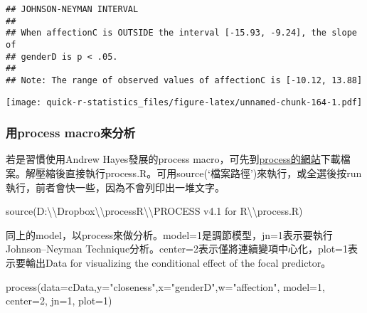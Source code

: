 \documentclass[
]{book}
\newenvironment{Shaded}{\begin{snugshade}}{\end{snugshade}}
\newcommand{\AttributeTok}[1]{\textcolor[rgb]{0.77,0.63,0.00}{#1}}
\newcommand{\DecValTok}[1]{\textcolor[rgb]{0.00,0.00,0.81}{#1}}
\newcommand{\FunctionTok}[1]{\textcolor[rgb]{0.00,0.00,0.00}{#1}}
\newcommand{\NormalTok}[1]{#1}
\newcommand{\SpecialCharTok}[1]{\textcolor[rgb]{0.00,0.00,0.00}{#1}}
\newcommand{\StringTok}[1]{\textcolor[rgb]{0.31,0.60,0.02}{#1}}
\begin{document}
\begin{verbatim}
## JOHNSON-NEYMAN INTERVAL 
## 
## When affectionC is OUTSIDE the interval [-15.93, -9.24], the slope of
## genderD is p < .05.
## 
## Note: The range of observed values of affectionC is [-10.12, 13.88]
\end{verbatim}

\texttt{[image: quick-r-statistics\_files/figure-latex/unnamed-chunk-164-1.pdf]}

\hypertarget{ux7528process-macroux4f86ux5206ux6790}{%
\subsubsection{用process macro來分析}\label{ux7528process-macroux4f86ux5206ux6790}}

若是習慣使用Andrew Hayes發展的process macro，可先到\href{https://www.processmacro.org/index.html}{process的網站}下載檔案。解壓縮後直接執行process.R。可用source(`檔案路徑')來執行，或全選後按run執行，前者會快一些，因為不會列印出一堆文字。

\begin{Shaded}
\begin{Highlighting}[]
\FunctionTok{source}\NormalTok{(}\StringTok{\textquotesingle{}D:}\SpecialCharTok{\textbackslash{}\textbackslash{}}\StringTok{Dropbox}\SpecialCharTok{\textbackslash{}\textbackslash{}}\StringTok{processR}\SpecialCharTok{\textbackslash{}\textbackslash{}}\StringTok{PROCESS v4.1 for R}\SpecialCharTok{\textbackslash{}\textbackslash{}}\StringTok{process.R\textquotesingle{}}\NormalTok{)}
\end{Highlighting}
\end{Shaded}

同上的model，以process來做分析。model=1是調節模型，jn=1表示要執行Johnson--Neyman Technique分析。center=2表示僅將連續變項中心化，plot=1表示要輸出Data for visualizing the conditional effect of the focal predictor。

\begin{Shaded}
\begin{Highlighting}[]
\FunctionTok{process}\NormalTok{(}\AttributeTok{data=}\NormalTok{cData,}\AttributeTok{y=}\StringTok{"closeness"}\NormalTok{,}\AttributeTok{x=}\StringTok{"genderD"}\NormalTok{,}\AttributeTok{w=}\StringTok{"affection"}\NormalTok{, }\AttributeTok{model=}\DecValTok{1}\NormalTok{, }\AttributeTok{center=}\DecValTok{2}\NormalTok{, }\AttributeTok{jn=}\DecValTok{1}\NormalTok{, }\AttributeTok{plot=}\DecValTok{1}\NormalTok{)}
\end{Highlighting}
\end{Shaded}
\end{document}
